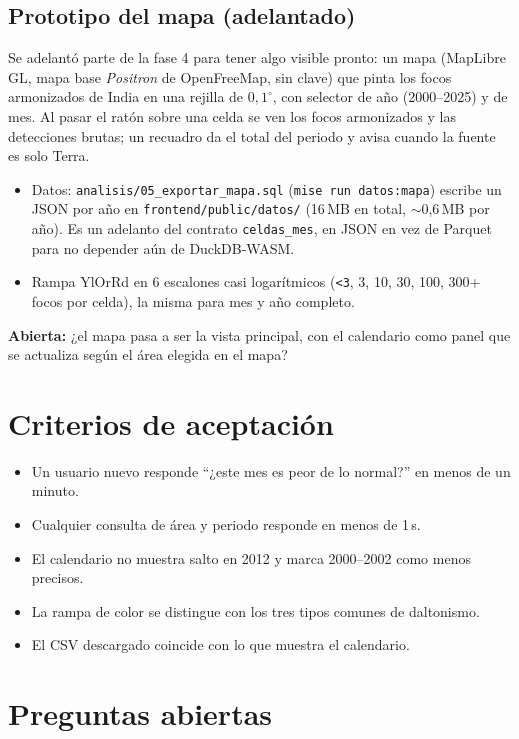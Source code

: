 \documentclass[11pt,a4paper]{article}
\newcommand{\abierta}[1]{\textcolor{orange!80!black}{\textbf{Abierta:}} #1}
\begin{document}
\subsection*{Prototipo del mapa (adelantado)}

Se adelantó parte de la fase 4 para tener algo visible pronto: un mapa (MapLibre GL,
mapa base \emph{Positron} de OpenFreeMap, sin clave) que pinta los focos armonizados
de India en una rejilla de $0{,}1^\circ$, con selector de año (2000--2025) y de mes.
Al pasar el ratón sobre una celda se ven los focos armonizados y las detecciones brutas;
un recuadro da el total del periodo y avisa cuando la fuente es solo Terra.

\begin{itemize}
  \item Datos: \texttt{analisis/05\_exportar\_mapa.sql} (\texttt{mise run datos:mapa})
        escribe un JSON por año en \texttt{frontend/public/datos/} (16\,MB en total,
        $\sim$0,6\,MB por año). Es un adelanto del contrato \texttt{celdas\_mes}, en JSON
        en vez de Parquet para no depender aún de DuckDB-WASM.
  \item Rampa YlOrRd en 6 escalones casi logarítmicos (\texttt{<3}, 3, 10, 30, 100, 300+
        focos por celda), la misma para mes y año completo.
\end{itemize}

\abierta{¿el mapa pasa a ser la vista principal, con el calendario como panel que se
actualiza según el área elegida en el mapa?}

\section{Criterios de aceptación}

\begin{itemize}
  \item Un usuario nuevo responde ``¿este mes es peor de lo normal?'' en menos de un minuto.
  \item Cualquier consulta de área y periodo responde en menos de 1\,s.
  \item El calendario no muestra salto en 2012 y marca 2000--2002 como menos precisos.
  \item La rampa de color se distingue con los tres tipos comunes de daltonismo.
  \item El CSV descargado coincide con lo que muestra el calendario.
\end{itemize}

\section{Preguntas abiertas}
\end{document}
